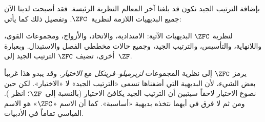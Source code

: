 \documentclass[../../../include/open-logic-section]{subfiles}
\begin{document}

بإضافة الترتيب الجيد نكون قد بلغنا آخر المعالم النظرية الرئيسة. فقد
أصبحت لدينا الآن جميع البديهيات اللازمة لنظرية~$\ZFC$. وتفصيل ذلك كما
يأتي:

\begin{defn}
لنظرية $\ZFC$ البديهيات الآتية: الامتدادية، والاتحاد، والأزواج، ومجموعات
القوى، واللانهاية، والتأسيس، والترتيب الجيد، وجميع حالات مخططي الفصل
والاستبدال. وبعبارة أخرى، تضيف $\ZFC$ الترتيب الجيد إلى~$\ZF$.
\end{defn}

يرمز $\ZFC$ إلى نظرية المجموعات \emph{لزيرميلو--فرينكل} مع
\emph{الاختيار}. وقد يبدو هذا غريباً بعض الشيء، لأن البديهية التي أضفناها
تسمى «الترتيب الجيد» لا «الاختيار». لكن حين نصوغ {الاختيار} لاحقاً سيتبين
أن الترتيب الجيد يكافئ الاختيار (بالنسبة إلى~$\ZF$؛ انظر
). ومن ثم لا فرق في أيهما نتخذه
بديهية «أساسية». كما أن الاسم «$\ZFC$» هو الاسم القياسي تماماً في
الأدبيات.
\end{document}
